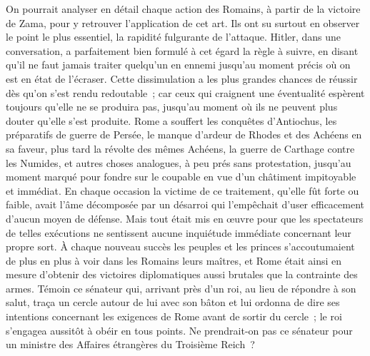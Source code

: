 \documentclass[french,twoside]{book} %
\begin{document}
On pourrait analyser en détail chaque action des Romains, à partir de la victoire de Zama, pour y retrouver l'application de cet art. Ils ont su surtout en observer le point le plus essentiel, la rapidité fulgurante de l'attaque. Hitler, dans une conversation, a parfaitement bien formulé à cet égard la règle à suivre, en disant qu'il ne faut jamais traiter quelqu'un en ennemi jusqu'au moment précis où on est en état de l'écraser. Cette dissimulation a les plus grandes chances de réussir dès qu'on s'est rendu redoutable ; car ceux qui craignent une éventualité espèrent toujours qu'elle ne se produira pas, jusqu'au moment où ils ne peuvent plus douter qu'elle s'est produite. Rome a souffert les conquêtes d'Antiochus, les préparatifs de guerre de Persée, le manque d'ardeur de Rhodes et des Achéens en sa faveur, plus tard la révolte des mêmes Achéens, la guerre de Carthage contre les Numides, et autres choses analogues, à peu prés sans protestation, jusqu'au moment marqué pour fondre sur le coupable en vue d'un châtiment impitoyable et immédiat. En chaque occasion la victime de ce traitement, qu'elle fût forte ou faible, avait l'âme décomposée par un désarroi qui l'empêchait d'user efficacement d'aucun moyen de défense. Mais tout était mis en œuvre pour que les spectateurs de telles exécutions ne sentissent aucune inquiétude immédiate concernant leur propre sort. À chaque nouveau succès les peuples et les princes s'accoutu­maient de plus en plus à voir dans les Romains leurs maîtres, et Rome était ainsi en mesure d'obtenir des victoires diplomatiques aussi brutales que la contrainte des armes. Témoin ce sénateur qui, arrivant près d'un roi, au lieu de répondre à son salut, traça un cercle autour de lui avec son bâton et lui ordonna de dire ses intentions concernant les exigences de Rome avant de sortir du cercle ; le roi s'engagea aussitôt à obéir en tous points. Ne prendrait-on pas ce sénateur pour un ministre des Affaires étrangères du Troisième Reich ?\par
\end{document}
